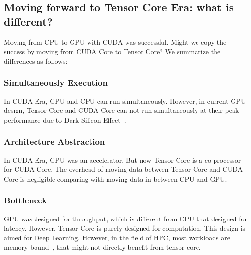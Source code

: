 \subsection{Moving forward to Tensor Core Era: what is different?}
Moving from CPU to GPU with CUDA was successful. Might we copy the success by moving from CUDA Core to Tensor Core? We summarize the differences as follows:
\subsubsection{Simultaneously Execution}
In CUDA Era, GPU and CPU can run simultaneously. However, in current GPU design, Tensor Core and CUDA Core can not run simultaneously at their peak performance due to Dark Silicon Effect~\cite{9460517}. 
\subsubsection{Architecture Abstraction}
In CUDA Era, GPU was an accelerator. But now Tensor Core is a co-processor for CUDA Core. The overhead of moving data between Tensor Core and CUDA Core is negligible comparing with moving data in between CPU and GPU. 
\subsubsection{Bottleneck}
GPU was designed for throughput, which is different from CPU that designed for latency. However, Tensor Core is purely designed for computation. This design is aimed for Deep Learning. However, in the field of HPC, most workloads are memory-bound~\cite{austinsystem}, that might not directly benefit from tensor core. 
